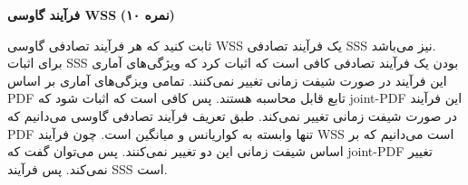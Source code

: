 \Large \textbf{فرآیند گاوسی WSS}
\large \textbf{(۱۰ نمره)}

\normalsize \vspace{0.5cm}
ثابت کنید که هر فرآیند تصادفی گاوسی WSS یک فرآیند تصادفی SSS نیز می‌باشد.
\\
برای اثبات SSS بودن یک فرآیند تصادفی کافی است که اثبات کرد که ویژگی‌های آماری این فرآیند در صورت شیفت زمانی تغییر نمی‌کنند. تمامی ویزگی‌های آماری بر اساس PDF تابع قابل محاسبه هستند. پس کافی است که اثبات شود که joint-PDF این فرآیند در صورت شیفت زمانی تغییر نمی‌کند. طبق تعریف فرآیند تصادفی گاوسی می‌دانیم که PDF تنها وابسته به کواریانس و میانگین است. چون فرآیند WSS است می‌دانیم که بر اساس شیفت زمانی این دو تغییر نمی‌کنند. پس می‌توان گفت که joint-PDF تغییر نمی‌کند. پس فرآیند SSS است.